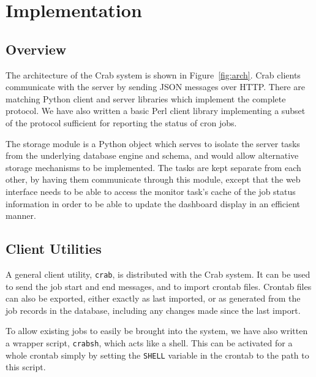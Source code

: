 \section{Implementation}

\subsection{Overview}


The architecture of the Crab system is shown in Figure~\ref{fig:arch}. Crab clients communicate with the server by sending JSON messages over HTTP. There are matching Python client and server libraries which implement the complete protocol. We have also written a basic Perl client library implementing a subset of the protocol sufficient for reporting the status of cron jobs.

The storage module is a Python object which serves to isolate the server tasks from the underlying database engine and schema, and would allow alternative storage mechanisms to be implemented. The tasks are kept separate from each other, by having them communicate through this module, except that the web interface needs to be able to access the monitor task's cache of the job status information in order to be able to update the dashboard display in an efficient manner.

\subsection{Client Utilities}


A general client utility, \texttt{crab}, is distributed with the Crab system. It can be used to send the job start and end messages, and to import crontab files. Crontab files can also be exported, either exactly as last imported, or as generated from the job records in the database, including any changes made since the last import.

To allow existing jobs to easily be brought into the system, we have also written a wrapper script, \texttt{crabsh}, which acts like a shell. This can be activated for a whole crontab simply by setting the \texttt{SHELL} variable in the crontab to the path to this script.

